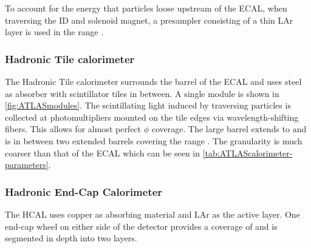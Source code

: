 To account for the energy that particles loose upstream of the ECAL, when traversing the ID and solenoid magnet, a presampler consisting of a thin LAr layer is used in the range . 


\subsubsection{Hadronic Tile calorimeter}
The Hadronic Tile calorimeter surrounds the barrel of the ECAL and uses steel as absorber with scintillator tiles in between. A single module is shown in \cref{fig:ATLASmodules}. The scintillating light induced by traversing particles is collected at photomultipliers mounted on the tile edges via wavelength-shifting fibers. This allows for almost perfect $\phi$ coverage. The large barrel extends to  and is in between two extended barrels covering the range . The granularity is much coarser than that of the ECAL which can be seen in \cref{tab:ATLAScalorimeter-parameters}. 


\subsubsection{Hadronic End-Cap Calorimeter}
The HCAL uses copper as absorbing material and LAr as the active layer. One end-cap wheel on either side of the detector provides a coverage of  and is segmented in depth into two layers. 


